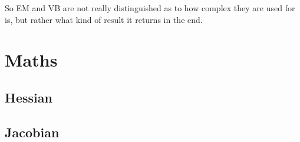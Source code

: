 \documentclass{book}
\begin{document}
So EM and VB are not really distinguished as to how complex they are used for is, but rather what kind of result it returns in the end.

\chapter{Maths}

\section{Hessian}

\section{Jacobian}

\newpage
\renewcommand{\cftchapdotsep}{\cftdotsep}
\tableofcontents


\newpage

 
\end{document}
